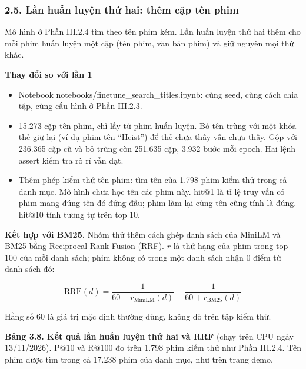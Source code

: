 \documentclass[12pt,a4paper]{article}
\providecommand{\tightlist}{\setlength{\itemsep}{0pt}\setlength{\parskip}{0pt}}
\newcommand{\np}{\Needspace{8\baselineskip}}
\newcommand{\lbl}[1]{\Needspace{6\baselineskip}\textbf{#1}\par\nopagebreak}
\let\oldsubsubsection\subsubsection
\renewcommand{\subsubsection}{\Needspace{10\baselineskip}\oldsubsubsection}
\begin{document}
\subsubsection{2.5. Lần huấn luyện thứ hai: thêm cặp tên phim}

Mô hình ở Phần III.2.4 tìm theo tên phim kém. Lần huấn luyện thứ hai thêm cho mỗi phim huấn luyện một cặp (tên phim, văn bản phim) và giữ nguyên mọi thứ khác.

\lbl{Thay đổi so với lần 1}

\begin{itemize}
\tightlist
\item Notebook notebooks/finetune\_search\_titles.ipynb: cùng seed, cùng cách chia tập, cùng cấu hình ở Phần III.2.3.
\item 15.273 cặp tên phim, chỉ lấy từ phim huấn luyện. Bỏ tên trùng với một khóa thẻ giữ lại (ví dụ phim tên ``Heist'') để thẻ chưa thấy vẫn chưa thấy. Gộp với 236.365 cặp cũ và bỏ trùng còn 251.635 cặp, 3.932 bước mỗi epoch. Hai lệnh assert kiểm tra rò rỉ vẫn đạt.
\item Thêm phép kiểm thử tên phim: tìm tên của 1.798 phim kiểm thử trong cả danh mục. Mô hình chưa học tên các phim này. hit@1 là tỉ lệ truy vấn có phim mang đúng tên đó đứng đầu; phim làm lại cùng tên cũng tính là đúng. hit@10 tính tương tự trên top 10.
\end{itemize}

\textbf{Kết hợp với BM25.} Nhóm thử thêm cách ghép danh sách của MiniLM và BM25 bằng Reciprocal Rank Fusion (RRF). $r$ là thứ hạng của phim trong top 100 của mỗi danh sách; phim không có trong một danh sách nhận 0 điểm từ danh sách đó:

\[
\mathrm{RRF}(d)=\frac{1}{60+r_{\mathrm{MiniLM}}(d)}+\frac{1}{60+r_{\mathrm{BM25}}(d)}
\]

Hằng số 60 là giá trị mặc định thường dùng, không dò trên tập kiểm thử.

\np\textbf{Bảng 3.8. Kết quả lần huấn luyện thứ hai và RRF} (chạy trên CPU ngày 13/11/2026). P@10 và R@100 đo trên 1.798 phim kiểm thử như Phần III.2.4. Tên phim được tìm trong cả 17.238 phim của danh mục, như trên trang demo.
\end{document}
